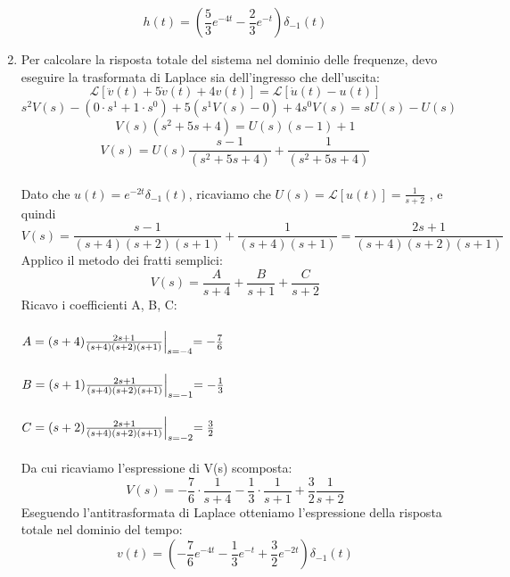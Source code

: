 \documentclass[12pt,a4paper]{article}
\begin{document}
\begin{enumerate}
   	\[
   		h(t) = \left(\frac{5}{3}e^{-4t}-\frac{2}{3}e^{-t}\right) \delta_{-1}(t)
   	\]
	\item Per calcolare la risposta totale del sistema nel dominio delle frequenze, devo eseguire la trasformata di Laplace sia dell'ingresso che dell'uscita:
	\[
		\mathcal{L}[\ddot{v}(t) + 5\dot{v}(t) + 4v(t)] = \mathcal{L}[\dot{u}(t) - u(t)]
	\]
	\vspace{5px}
	\[
		s^2V(s) - (0\cdot s^1+1\cdot s^0) + 5(s^1V(s)-0)+4s^0V(s) = sU(s) - U(s)
	\]
	\vspace{5px}
	\[
		V(s) (s^2 + 5s + 4) = U(s)(s-1) + 1
	\]
	\vspace{5px}
	\[
		V(s) = U(s)\frac{s-1}{(s^2+5s+4)}+\frac{1}{(s^2+5s+4)}
	\]
	\vspace{5px}
	\\Dato che $u(t) = e^{-2t} \delta_{-1}(t)$, ricaviamo che $U(s) = \mathcal{L}[u(t)] = \frac{1}{s+2} $ , e quindi
	\[
		V(s) = \frac{s-1}{(s+4)(s+2)(s+1)}+\frac{1}{(s+4)(s+1)} = \frac{2s+1}{(s+4)(s+2)(s+1)}
	\]
	Applico il metodo dei fratti semplici:
	\[
		V(s) = \frac{A}{s+4}+\frac{B}{s+1}+\frac{C}{s+2}
	\]
	Ricavo i coefficienti A, B, C:\\ \\
	$A = (s+4)\frac{2s+1}{(s+4)(s+2)(s+1)}\Bigl\vert_{s=-4} = -\frac{7}{6}$\\ \\
	$B = (s+1)\frac{2s+1}{(s+4)(s+2)(s+1)}\Bigl\vert_{s=-1} = -\frac{1}{3}$\\ \\
	$C = (s+2)\frac{2s+1}{(s+4)(s+2)(s+1)}\Bigl\vert_{s=-2} = \frac{3}{2}$\\ \\
	Da cui ricaviamo l'espressione di V(s) scomposta:
	\[
		V(s) = -\frac{7}{6}\cdot\frac{1}{s+4}-\frac{1}{3}\cdot\frac{1}{s+1}+\frac{3}{2}\frac{1}{s+2}
	\]
	Eseguendo l'antitrasformata di Laplace otteniamo l'espressione della risposta totale nel dominio del tempo:
	\[
		v(t) = \left(-\frac{7}{6}e^{-4t}-\frac{1}{3}e^{-t}+\frac{3}{2}e^{-2t}\right)\delta_{-1}(t)
	\]
	\end{enumerate}
	\newpage
\end{document}
